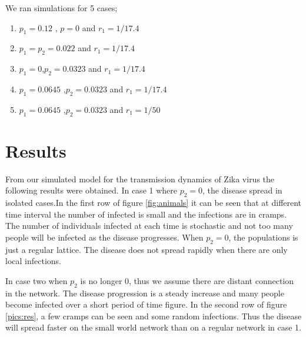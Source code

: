 We ran simulations for 5 cases;
\begin{enumerate}
\item $p_1 = 0.12$ , $p =0$ and $r_1 = 1/17.4$
\item $p_1 = p_2 = 0.022$ and $r_1 = 1/17.4$ 
\item $p_1 =0 $,$p_2 = 0.0323$ and $r_1 = 1/17.4$
\item $p_1 = 0.0645$ ,$p_2 = 0.0323$ and $r_1 = 1/17.4$
\item $p_1 = 0.0645$ ,$p_2 = 0.0323$ and $r_1 = 1/50$
\end{enumerate}

\section{Results}
From our simulated model for the transmission dynamics of Zika virus the following results were obtained. In case 1 where $p_2 =0$, the disease spread in isolated cases.In the first row of figure  \ref{fig:animals} it can be seen that at different time interval the number of infected is small and  the infections are in cramps.  The number of individuals infected at each time is stochastic and not too many people will be infected as the disease progresses.  When $p_2 = 0$, the populations is just a regular lattice. The disease does not spread rapidly when there are only local infections.

In case two when $p_2$ is no longer 0, thus we assume there are distant connection in the network. The disease progression is a steady increase and many people become infected over a short period of time figure. In the second row of figure \ref{pics:res}, a few cramps can be seen and some random infections.  Thus the disease will spread faster on the small world network than on a regular network in case 1.

